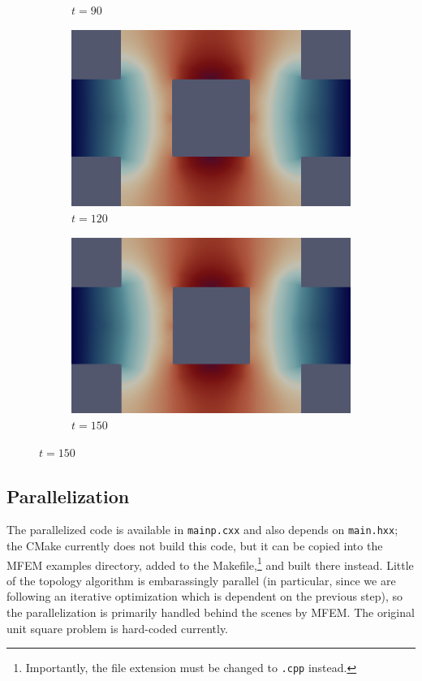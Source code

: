 \begin{figure}[H]
\begin{subfigure}{.4\textwidth}
        \caption{$t = 90$}
    \end{subfigure}
    \begin{subfigure}{.4\textwidth}
        \includegraphics[width=\textwidth]{imgs/HeatSink_Solution/seventh.png}
        \caption{$t = 120$}
    \end{subfigure}
    \begin{subfigure}{.4\textwidth}
        \includegraphics[width=\textwidth]{imgs/HeatSink_Solution/eighth.png}
        \caption{$t = 150$}
    \end{subfigure}
\end{figure}

\vfill\pagebreak

\subsection{Parallelization}

The parallelized code is available in \texttt{mainp.cxx} and also depends on \texttt{main.hxx};
the CMake currently does not build this code, but it can be copied into the MFEM examples directory,
added to the Makefile,\footnote{Importantly, the file extension must be changed to \texttt{.cpp} instead.}
and built there instead.
Little of the topology algorithm is embarassingly parallel (in particular, since we are following an iterative optimization
which is dependent on the previous step), so the parallelization is primarily handled behind the scenes by MFEM.
The original unit square problem is hard-coded currently.


